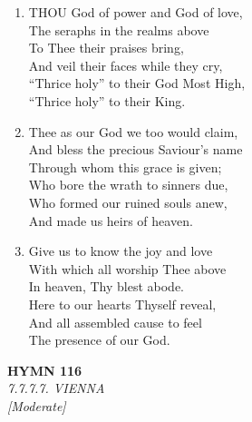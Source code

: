 \begin{enumerate}
    \item THOU God of power and God of love, \\
        The seraphs in the realms above \\
        To Thee their praises bring, \\
        And veil their faces while they cry, \\
        ``Thrice holy'' to their God Most High, \\
        ``Thrice holy'' to their King.

    \item Thee as our God we too would claim, \\
        And bless the precious Saviour's name \\
        Through whom this grace is given; \\
        Who bore the wrath to sinners due, \\
        Who formed our ruined souls anew, \\
        And made us heirs of heaven.

    \item Give us to know the joy and love \\
        With which all worship Thee above \\
        In heaven, Thy blest abode. \\
        Here to our hearts Thyself reveal, \\
        And all assembled cause to feel \\
        The presence of our God.

\end{enumerate}

\newpage
\begin{center}
    {\Large \textbf{HYMN 116}}
    \\
    \textit{7.7.7.7. VIENNA}
    \\
    \textit{\small [Moderate]}
\end{center}
\vspace{1em}

